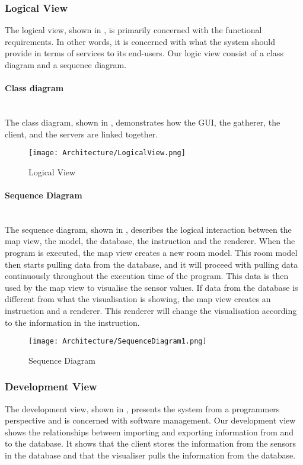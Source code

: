 \documentclass[../document.tex]{subfiles}
\begin{document}
\subsubsection{Logical View}		
The logical view, shown in , is primarily concerned with the functional requirements. In other words, it is concerned with what the system should provide in terms of services to its end-users. Our logic view consist of a class diagram and a sequence diagram.

\paragraph{Class diagram}\ \\
The class diagram, shown in , demonstrates how the GUI, the gatherer, the client, and the servers are linked together.

\begin{figure}[H]
	\centering
	\texttt{[image: Architecture/LogicalView.png]}
	\caption{Logical View}
	\label{fig:LogicalView}
\end{figure}

\paragraph{Sequence Diagram} \ \\
The sequence diagram, shown in , describes the logical interaction between the map view, the model, the database, the instruction and the renderer. When the program is executed, the map view creates a new room model. This room model then starts pulling data from the database, and it will proceed with pulling data continuously throughout the execution time of the program. This data is then used by the map view to visualise the sensor values. If data from the database is different from what the visualisation is showing, the map view creates an instruction and a renderer. This renderer will change the visualisation according to the information in the instruction.

\begin{figure}[H]
	\centering
	\texttt{[image: Architecture/SequenceDiagram1.png]}
	\caption{Sequence Diagram}
	\label{fig:SequenceDiagram1}
\end{figure}

\subsubsection{Development View}
The development view, shown in ,  presents the system from a programmers perspective and is concerned with software management. Our development view shows the relationships between importing and exporting information from and to the database. It shows that the client stores the information from the sensors in the database and that the visualiser pulls the information from the database.
\end{document}
